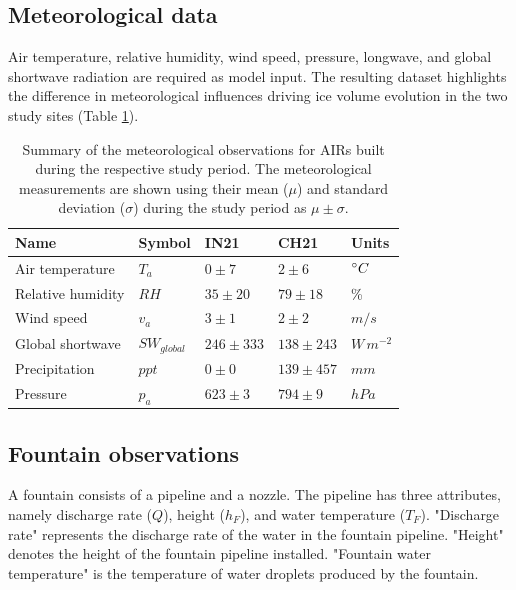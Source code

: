 \subsection{Meteorological data}

Air temperature, relative humidity, wind speed, pressure, longwave, and global shortwave radiation are required
as model input. The resulting dataset highlights the difference in meteorological influences driving ice volume
evolution in the two study sites (Table \ref{tab:Observations}).

\begin{table}
	\centering
	\caption{Summary of the meteorological observations for \ac{AIRs} built during the respective study period.
		The meteorological measurements are shown using their mean ($\mu$) and standard deviation ($\sigma$) during the study
		period as $\mu \pm \sigma$. }

	\label{tab:Observations}
	\begin{tabular}{|lllll|}
		\hline
		\textbf{Name}        & \textbf{Symbol} & \textbf{IN21} & \textbf{CH21} & \textbf{Units} \\ \hline
		Air temperature      & $T_a    $       & $0 \pm 7$     & $2 \pm 6$     & $^{\circ} C$    \\
		Relative humidity    & $RH     $       & $35 \pm 20$   & $79 \pm 18$   & \%             \\
		Wind speed           & $v_a        $   & $3 \pm 1$     & $2 \pm 2$     & $m/s$          \\
		Global shortwave     & $SW_{global} $  & $246 \pm 333$ & $138 \pm 243$  & $W\,m^{-2}$    \\
		Precipitation        & $ppt        $   & $0 \pm 0$     & $139 \pm 457$ & $mm$           \\
		Pressure             & $p_a         $  & $623 \pm 3$   & $794 \pm 9$   & $hPa$          \\\hline
	\end{tabular}
\end{table}

\subsection{Fountain observations}

A fountain consists of a pipeline and a nozzle. The pipeline has three attributes, namely discharge rate
($Q$), height ($h_F$), and water temperature ($T_F$). "Discharge rate" represents the discharge rate of the water in
the fountain pipeline. "Height" denotes the height of the fountain pipeline installed. "Fountain water temperature"
is the temperature of water droplets produced by the fountain.


